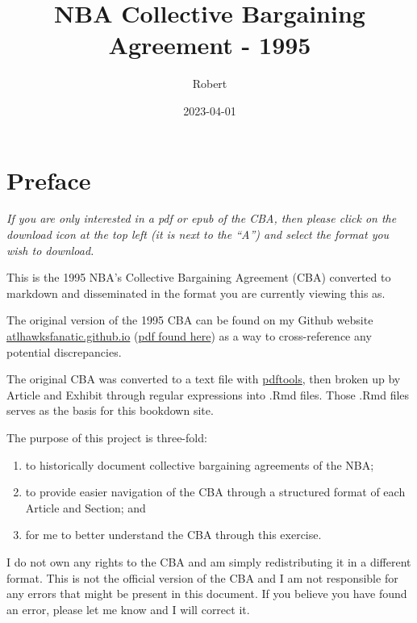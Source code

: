 \documentclass[
]{book}
\title{NBA Collective Bargaining Agreement - 1995}
\author{Robert}
\date{2023-04-01}
\providecommand{\tightlist}{%
  \setlength{\itemsep}{0pt}\setlength{\parskip}{0pt}}
\begin{document}
\maketitle

{
\setcounter{tocdepth}{1}
\tableofcontents
}
\hypertarget{preface}{%
\chapter*{Preface}\label{preface}}

\emph{If you are only interested in a pdf or epub of the CBA, then please click on the download icon at the top left (it is next to the ``A'') and select the format you wish to download.}

This is the 1995 NBA's Collective Bargaining Agreement (CBA) converted to markdown and disseminated in the format you are currently viewing this as.

The original version of the 1995 CBA can be found on my Github website \href{https://atlhawksfanatic.github.io/}{atlhawksfanatic.github.io} (\href{https://github.com/atlhawksfanatic/atlhawksfanatic.github.io/raw/master/research/CBA/1995-NBA-NBPA-Collective-Bargaining-Agreement.pdf}{pdf found here}) as a way to cross-reference any potential discrepancies.

The original CBA was converted to a text file with \href{https://github.com/ropensci/pdftools}{pdftools}, then broken up by Article and Exhibit through regular expressions into .Rmd files. Those .Rmd files serves as the basis for this bookdown site.

The purpose of this project is three-fold:

\begin{enumerate}
\def\labelenumi{\arabic{enumi}.}
\tightlist
\item
  to historically document collective bargaining agreements of the NBA;
\item
  to provide easier navigation of the CBA through a structured format of each Article and Section; and
\item
  for me to better understand the CBA through this exercise.
\end{enumerate}

I do not own any rights to the CBA and am simply redistributing it in a different format. This is not the official version of the CBA and I am not responsible for any errors that might be present in this document. If you believe you have found an error, please let me know and I will correct it.
\end{document}

